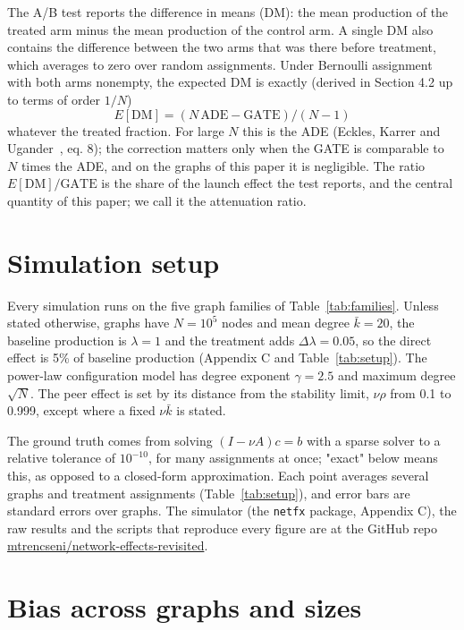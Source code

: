 \documentclass[final,5p,times,twocolumn,number]{elsarticle}
\begin{document}
The A/B test reports the difference in means (DM): the mean production of the treated arm minus the mean production of the control arm. A single DM also contains the difference between the two arms that was there before treatment, which averages to zero over random assignments. Under Bernoulli assignment with both arms nonempty, the expected DM is exactly (derived in Section 4.2 up to terms of order $1/N$)
\begin{equation}E[\mathrm{DM}] = (N\,\mathrm{ADE} - \mathrm{GATE})/(N - 1)\label{eq:edm}\end{equation}
whatever the treated fraction. For large $N$  this is the ADE (Eckles, Karrer and Ugander~\cite{r8}, eq. 8); the correction matters only when the GATE is comparable to $N$  times the ADE, and on the graphs of this paper it is negligible. The ratio $E[\mathrm{DM}]/\mathrm{GATE}$  is the share of the launch effect the test reports, and the central quantity of this paper; we call it the attenuation ratio.


\section{Simulation setup}

Every simulation runs on the five graph families of Table~\ref{tab:families}. Unless stated otherwise, graphs have $N = 10^5$  nodes and mean degree $\bar k = 20$, the baseline production is $\lambda = 1$  and the treatment adds $\Delta\lambda = 0.05$, so the direct effect is 5\% of baseline production (Appendix C and Table~\ref{tab:setup}). The power-law configuration model has degree exponent $\gamma = 2.5$  and maximum degree $\sqrt N$. The peer effect is set by its distance from the stability limit, $\nu\rho$  from 0.1 to 0.999, except where a fixed $\nu\bar k$  is stated.


The ground truth comes from solving $(I - \nu A)c = b$  with a sparse solver to a relative tolerance of $10^{-10}$, for many assignments at once; "exact" below means this, as opposed to a closed-form approximation. Each point averages several graphs and treatment assignments (Table~\ref{tab:setup}), and error bars are standard errors over graphs. The simulator (the \texttt{netfx} package, Appendix C), the raw results and the scripts that reproduce every figure are at the GitHub repo \href{https://github.com/mtrencseni/network-effects-revisited}{mtrencseni/network-effects-revisited}.


\section{Bias across graphs and sizes}
\end{document}
